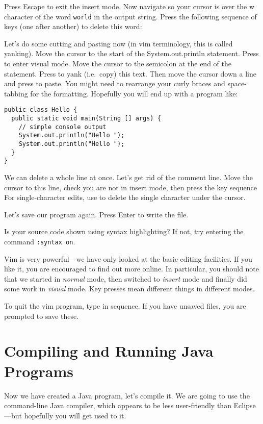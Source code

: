 \documentclass{article}
\begin{document}
Press Escape to exit the insert mode. Now navigate so your cursor is over the w character of the word \texttt{world} in the output string. Press the following sequence of keys (one after another) to delete this word:  

Let's do some cutting and pasting now (in vim terminology, this is called yanking).
Move the cursor to the start of the System.out.println statement. Press  to enter visual mode. Move the cursor to the semicolon at the end of the statement. Press  to yank (i.e.\ copy) this text.
Then move the cursor down a line and press  to paste. You might need to rearrange your curly braces and space-tabbing for the formatting. Hopefully you will end up with a program like:
\begin{lstlisting}[style=JavaProg]
public class Hello {
  public static void main(String [] args) {
    // simple console output
    System.out.println("Hello ");
    System.out.println("Hello ");
  }
}
\end{lstlisting}

We can delete a whole line at once. Let's get rid of the comment line. Move the cursor to this line, check you are not in insert mode, then press the key sequence  
For single-character edits, use  to delete the single character under the cursor.

Let's save our program again. Press \keys{\esc} \keys{:}  Enter to write the file.

Is your source code shown using syntax highlighting? If not, try entering the command \texttt{:syntax on}.

Vim is very powerful---we have only looked at the basic editing facilities. If you like it, you are encouraged to find out more online. In particular, you should note that we started in \emph{normal} mode, then switched to \emph{insert} mode and finally did some work in \emph{visual} mode. Key presses mean different things in different modes.

To quit the vim program, type \keys{\esc} \keys{:}  \keys{\enter} in sequence.
If you have unsaved files, you are prompted to save these. 

\section*{Compiling and Running Java Programs}

Now we have created a Java program, let's compile it. We are going to use the command-line Java compiler, which appears to be less user-friendly than Eclipse---but hopefully you will get used to it.
\end{document}
